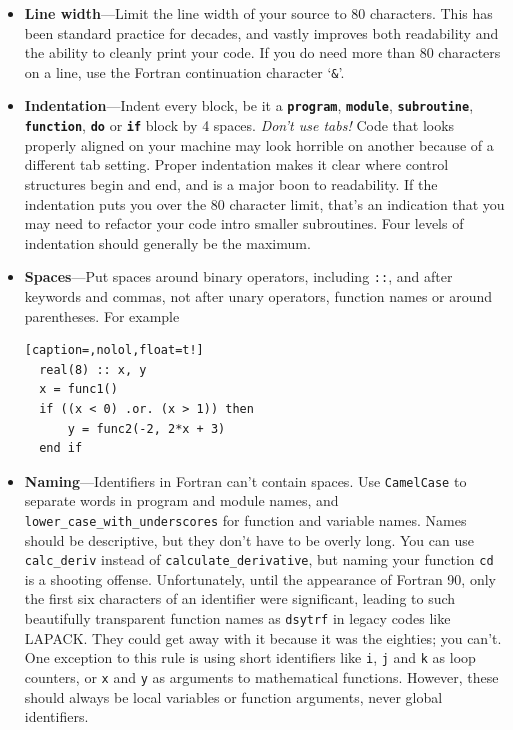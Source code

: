 \documentclass[openany,oneside]{report}
\newcommand{\keyword}[1]{\texttt{\bfseries\color{DarkRed}#1}}
\begin{document}
\begin{itemize}
  \item\textbf{Line width}---Limit the line width of your source to 80 characters.
    This has been standard practice for decades, and vastly improves both readability and the ability to cleanly print your code.
    If you do need more than 80 characters on a line, use the Fortran continuation character `\texttt{\&}'.
  \item\textbf{Indentation}---Indent every block, be it  a \keyword{program}, \keyword{module}, \keyword{subroutine}, \keyword{function}, \keyword{do} or \keyword{if} block by 4 spaces.
    \emph{Don't use tabs!} Code that looks properly aligned on your machine may look horrible on another because of a different tab setting.
    Proper indentation makes it clear where control structures begin and end, and is a major boon to readability.
    If the indentation puts you over the 80 character limit, that's an indication that you may need to refactor your code intro smaller subroutines.
    Four levels of indentation should generally be the maximum.
  \item\textbf{Spaces}---Put spaces around binary operators, including \texttt{::}, and after keywords and commas, not after unary operators, function names or around parentheses. For example\newpage
\begin{lstlisting}[caption=,nolol,float=t!]
  real(8) :: x, y
  x = func1()
  if ((x < 0) .or. (x > 1)) then
      y = func2(-2, 2*x + 3)
  end if
\end{lstlisting}
  \item\textbf{Naming}---Identifiers in Fortran can't contain spaces.
    Use \texttt{CamelCase} to separate words in program and module names, and \texttt{lower\_case\_with\_underscores} for function and variable names.
    Names should be descriptive, but they don't have to be overly long.
    You can use \texttt{calc\_deriv} instead of \texttt{calculate\_derivative}, but naming your function \texttt{cd} is a shooting offense.
    Unfortunately, until the appearance of Fortran 90, only the first six characters of an identifier were significant, leading to such beautifully transparent function names as \texttt{dsytrf} in legacy codes like LAPACK.
    They could get away with it because it was the eighties; you can't.
    One exception to this rule is using short identifiers like \texttt{i}, \texttt{j} and \texttt{k} as loop counters, or \texttt{x} and \texttt{y} as arguments to mathematical functions.
    However, these should always be local variables or function arguments, never global identifiers.

\end{itemize}
\end{document}
